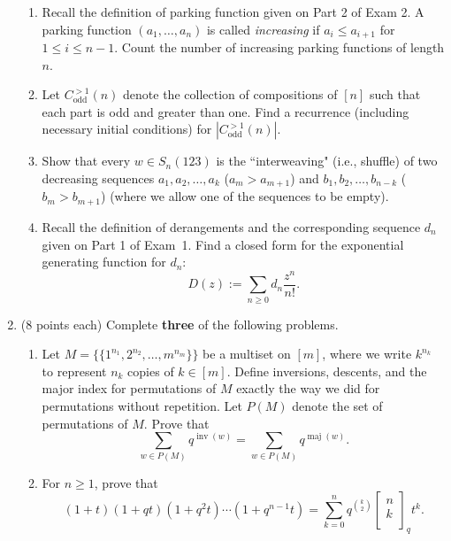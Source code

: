 \documentclass[11pt]{article}
\theoremstyle{definition}
\DeclareMathOperator{\inv}{inv}
\DeclareMathOperator{\maj}{maj}
\newcommand{\qbinom}[2]{
  \displaystyle \left[\begin{matrix}#1  \\#2  \\ \end{matrix}\right]}
\begin{document}
\begin{enumerate}
\begin{enumerate}

\item Recall the definition of parking function given on Part 2 of Exam 2.  A parking function $(a_1,\ldots,a_n)$ is called \emph{increasing} if $a_i\leq a_{i+1}$ for $1\leq i\leq n-1$. Count the number of increasing parking functions of length $n$.

\item Let $C^{>1}_{\text{odd}}(n)$ denote the collection of compositions of $[n]$  such that each part is odd and greater than one. Find a recurrence (including necessary initial conditions) for $|C^{>1}_{\text{odd}}(n)|$.

\item Show that every $w\in S_n(123)$ is the ``interweaving" (i.e., shuffle) of two decreasing sequences $a_1,a_2,\ldots, a_k$ ($a_m>a_{m+1}$) and $b_1,b_2,\ldots,b_{n-k}$ ($b_m>b_{m+1}$) (where we allow one of the sequences to be empty).

\item Recall the definition of derangements and the corresponding sequence $d_n$ given on Part 1 of Exam~1. Find a closed form for the exponential generating function for $d_n$:
\[
D(z):=\sum_{n\geq 0}d_n\frac{z^n}{n!}.
\]

\end{enumerate}

\item (8 points each) Complete \textbf{three} of the following problems.

\begin{enumerate}

\item Let $M= \{\{1^{n_1},2^{n_2},\ldots,m^{n_m}\}\}$ be a multiset on $[m]$, where we write $k^{n_k}$ to represent $n_k$ copies of $k\in[m]$. Define inversions, descents, and the major index for permutations of $M$ exactly the way we did for permutations without repetition. Let $P(M)$ denote the set of permutations of $M$. Prove that
\[
\sum_{w\in P(M)}q^{\inv(w)}=\sum_{w\in P(M)}q^{\maj(w)}.
\]


\item For $n\geq 1$, prove that
\[
(1+t)(1+qt)(1+q^2t)\cdots (1+q^{n-1}t)=\sum_{k=0}^nq^{\binom{k}{2}}\qbinom{n}{k}_qt^k.
\]


\end{enumerate}
\end{enumerate}
\end{document}
